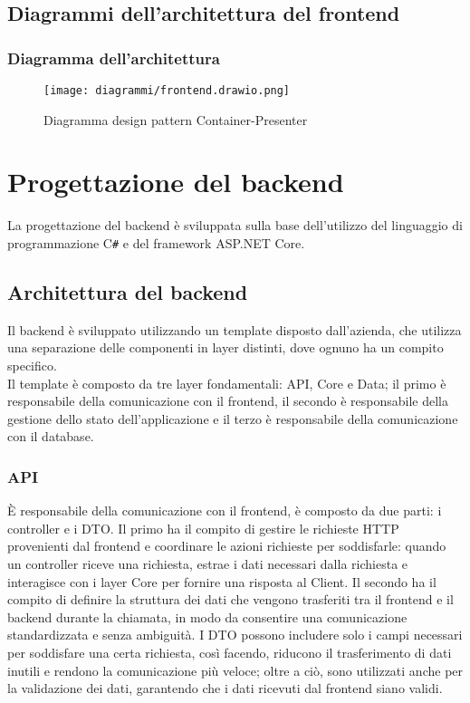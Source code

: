 \subsection{Diagrammi dell'architettura del frontend}
\subsubsection{Diagramma dell'architettura}
\begin{figure}[!h] 
    \centering 
    \texttt{[image: diagrammi/frontend.drawio.png]} 
    \caption{Diagramma design pattern Container-Presenter}
\end{figure}
\clearpage
\section{Progettazione del backend}
La progettazione del backend è sviluppata sulla base dell'utilizzo del linguaggio di programmazione C\texttt{\#} e del framework ASP.NET Core.\\

\subsection{Architettura del backend}
Il backend è sviluppato utilizzando un template disposto dall'azienda, che utilizza una separazione delle componenti in layer distinti, dove ognuno ha un compito specifico.\\
Il template è composto da tre layer fondamentali: API, Core e Data; il primo è responsabile della comunicazione con il frontend, il secondo è responsabile della gestione dello stato dell'applicazione e il terzo è responsabile della comunicazione con il database.\\

\subsubsection{API}
È responsabile della comunicazione con il frontend, è composto da due parti: i controller e i DTO. Il primo ha il compito di gestire le richieste HTTP provenienti dal frontend e coordinare le azioni richieste per soddisfarle: quando un controller riceve una richiesta, estrae i dati necessari dalla richiesta e interagisce con i layer Core per fornire una risposta al Client. 
Il secondo ha il compito di definire la struttura dei dati che vengono trasferiti tra il frontend e il backend durante la chiamata, in modo da consentire una comunicazione standardizzata e senza ambiguità. I DTO possono includere solo i campi necessari per soddisfare una certa richiesta, così facendo, riducono il trasferimento di dati inutili e rendono la comunicazione più veloce; oltre a ciò, sono utilizzati anche per la validazione dei dati, garantendo che i dati ricevuti dal frontend siano validi.\\
